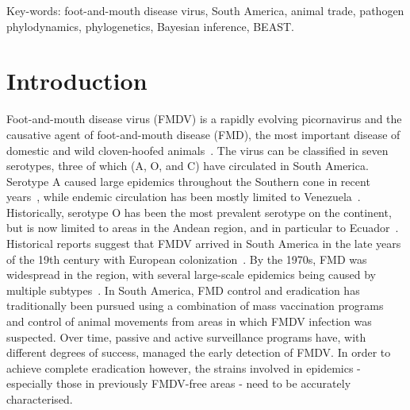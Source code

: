 \documentclass[10pt]{article}
\begin{document}
Key-words: foot-and-mouth disease virus, South America, animal trade, pathogen phylodynamics, phylogenetics, Bayesian inference, BEAST.

\section*{Introduction}


Foot-and-mouth disease virus (FMDV) is a rapidly evolving picornavirus and the causative agent of foot-and-mouth disease (FMD), the most important disease of domestic and wild cloven-hoofed animals~\citep{Grubman2004}.
The virus can be classified in seven serotypes, three of which (A, O, and C) have circulated in South America.
Serotype A caused large epidemics throughout the Southern cone in recent years~\citep{Perez2001, Malirat2012}, while endemic circulation has been mostly limited to Venezuela~\citep{Malirat2012}.
Historically, serotype O has been the most prevalent serotype on the continent, but is now limited to areas in the Andean region, and in particular to Ecuador~\citep{Malirat2011a}.
Historical reports suggest that FMDV arrived in South America in the late years of the 19th century with European colonization~\citep{Naranjo2013, Tully2008}. 
By the 1970s, FMD was widespread in the region, with several large-scale epidemics being caused by multiple subtypes~\citep{Saraiva2003}.
In South America, FMD control and eradication has traditionally been pursued using a combination of mass vaccination programs~\citep{Saraiva2004b} and control of animal movements from areas in which FMDV infection was suspected.
Over time, passive and active surveillance programs have, with different degrees of success, managed the early detection of FMDV.
In order to achieve complete eradication however, the strains involved in epidemics - especially those in previously FMDV-free areas - need to be accurately characterised.
\end{document}
